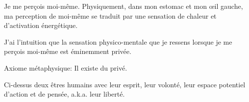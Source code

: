 \documentclass[11pt,a4paper]{article}
\begin{document}
\begin{I}
Je me perçois moi-même. Physiquement, dans mon estomac et mon œil gauche, ma perception de moi-même se traduit par une sensation de chaleur et d'activation énergétique.
\end{I}

\begin{I}
J'ai l'intuition que la sensation physico-mentale que je ressens lorsque je me perçois moi-même est éminemment privée.
\end{I}

\begin{I}
Axiome métaphysique: Il existe du privé.
\end{I}

\begin{I}
\phantom{hey}\newline
{}

Ci-dessus deux êtres humains avec leur esprit, leur volonté, leur espace potentiel d'action et de pensée, a.k.a. leur liberté.


\end{I}
\end{document}
